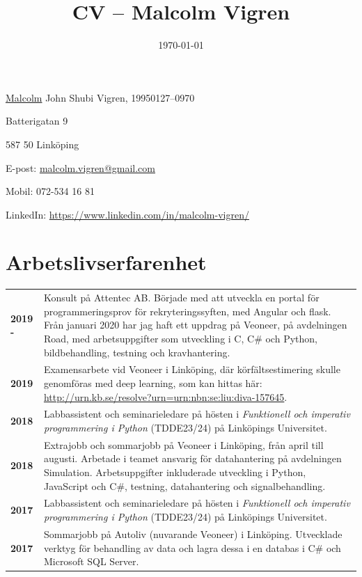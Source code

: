 \documentclass[a4paper,notitlepage]{article}
\title{
\huge{CV -- Malcolm Vigren}\vspace{-3ex}}
\date{\today}
\makeatletter
\newcommand{\at}{@}
\makeatother
\begin{document}
	\maketitle
\underline{Malcolm} John Shubi Vigren, 19950127--0970

Batterigatan 9

587 50 Linköping

E-post: \underline{malcolm.vigren\at{}gmail.com}

Mobil: 072-534 16 81

LinkedIn: \url{https://www.linkedin.com/in/malcolm-vigren/}

\section*{Arbetslivserfarenhet}
\begin{longtable}{@{}l p{13cm}}
\textbf{2019 - } & Konsult på Attentec AB. Började med att utveckla en portal
    för programmeringsprov för rekryteringssyften, med Angular och
    flask. Från januari 2020 har jag haft ett uppdrag på Veoneer, på
    avdelningen Road, med arbetsuppgifter som utveckling i C, C\# och Python,
    bildbehandling, testning och kravhantering. \\

\textbf{2019} & Examensarbete vid Veoneer i Linköping, där
    körfältsestimering skulle genomföras med deep learning, som kan hittas här:
    \url{http://urn.kb.se/resolve?urn=urn:nbn:se:liu:diva-157645}. \\

\textbf{2018} & Labbassistent och seminarieledare på hösten i \textit{Funktionell och
    imperativ programmering i Python} (TDDE23/24) på Linköpings
    Universitet. \\

\textbf{2018} & Extrajobb och sommarjobb på Veoneer i Linköping, från april till augusti.
    Arbetade i teamet ansvarig för datahantering på avdelningen 
    Simulation. Arbetsuppgifter inkluderade utveckling i Python, JavaScript och
    C\#,
    testning, datahantering och signalbehandling. \\

\textbf{2017} & Labbassistent och seminarieledare på hösten i \textit{Funktionell och
    imperativ programmering i Python} (TDDE23/24) på Linköpings
    Universitet. \\

\textbf{2017} & Sommarjobb på Autoliv (nuvarande Veoneer) i Linköping. Utvecklade verktyg 
    för behandling av data och lagra dessa i en databas i C\# och Microsoft SQL Server. \\


\end{longtable}
\end{document}

